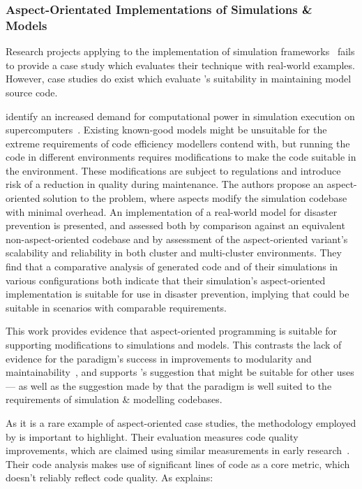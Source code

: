 \subsubsection{Aspect-Orientated Implementations of Simulations \& Models}

Research projects applying \aspectorientation{} to the implementation of
simulation frameworks~\cite{chibani} fails to provide a case study which evaluates
their technique with real-world examples. However, case studies do exist which
evaluate \aspectorientation{}'s suitability in maintaining model source code.

\citeauthor{ionescu2009aspect} identify an increased demand for computational power in
simulation execution on supercomputers~\cite{ionescu2009aspect}. Existing
known-good models might be unsuitable for the extreme requirements of code
efficiency modellers contend with, but running the code in different
environments requires modifications to make the code suitable in the
environment. These modifications are subject to regulations and introduce risk
of a reduction in quality during maintenance. The authors propose an
aspect-oriented solution to the problem, where aspects modify the simulation
codebase with minimal overhead. An implementation of a real-world model for
disaster prevention is presented, and assessed both by comparison against an
equivalent non-aspect-oriented codebase and by assessment of the aspect-oriented
variant's scalability and reliability in both cluster and multi-cluster
environments. They find that a comparative analysis of generated code and of
their simulations in various configurations both indicate that their
simulation's aspect-oriented implementation is suitable for use in disaster
prevention, implying that \aspectorientation{} could be suitable in scenarios with
comparable requirements.

This work provides evidence that aspect-oriented programming is suitable for
supporting modifications to simulations and models. This contrasts the lack of
evidence for the paradigm's success in improvements to modularity and
maintainability~\cite{przybylek2010wrong,Constantinides04aopconsidered}, and
supports \citet{steimann06paradoxical}'s suggestion that \aspectorientation{}
might be suitable for other uses --- as well as the suggestion made by
\citet{gulyas1999use} that the paradigm is well suited to the requirements of
simulation \& modelling codebases.

As it is a rare example of aspect-oriented case studies, the methodology
employed by \citeauthor{ionescu2009aspect} is important to highlight. Their
evaluation measures code quality improvements, which are claimed using similar
measurements in early \aspectorientation{} research~\cite{kiczales1997aspect}.
Their code analysis makes use of significant lines of code as a core metric,
which doesn't reliably reflect code quality. As \citet{rosenberg1997some}
explains:

